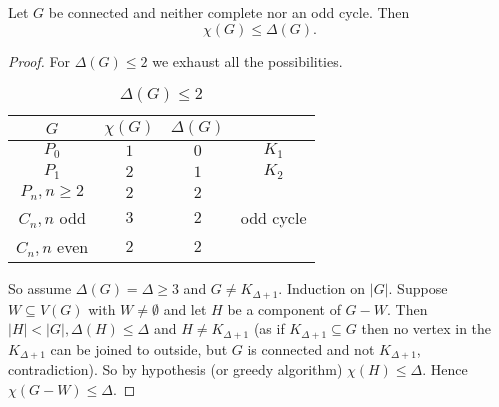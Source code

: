 \documentclass[a4paper]{article}
\begin{document}
\begin{theorem}[Brookes]
  Let \(G\) be connected and neither complete nor an odd cycle. Then
  \[
    \chi(G) \leq \Delta(G).
  \]
\end{theorem}

\begin{proof}
  For \(\Delta(G) \leq 2\) we exhaust all the possibilities.
  \begin{table}[h]
    \centering
    \begin{tabular}{|c|c|c|c|}
      \hline
      \(G\) & \(\chi(G)\) & \(\Delta(G)\) & \\ \hline
      \(P_0\) & \(1\) & \(0\) & \(K_1\) \\ \hline
      \(P_1\) & \(2\) & \(1\) & \(K_2\) \\ \hline
      \(P_n, n \geq 2\) & \(2\) & \(2\) & \\ \hline
      \(C_n, n\) odd & \(3\) & \(2\) & odd cycle \\ \hline
      \(C_n, n\) even & \(2\) & \(2\) & \\ \hline
    \end{tabular}
    \caption{\(\Delta(G) \leq 2\)}
  \end{table}
  So assume \(\Delta(G) = \Delta \geq 3\) and \(G \neq K_{\Delta + 1}\). Induction on \(|G|\). Suppose \(W \subseteq V(G)\) with \(W \neq \emptyset\) and let \(H\) be a component of \(G - W\). Then \(|H| < |G|, \Delta(H) \leq \Delta\) and \(H \neq K_{\Delta + 1}\) (as if \(K_{\Delta + 1} \subseteq G\) then no vertex in the \(K_{\Delta + 1}\) can be joined to outside, but \(G\) is connected and not \(K_{\Delta + 1}\), contradiction). So by hypothesis (or greedy algorithm) \(\chi(H) \leq \Delta\). Hence \(\chi(G - W) \leq \Delta\).


\end{proof}
\end{document}
